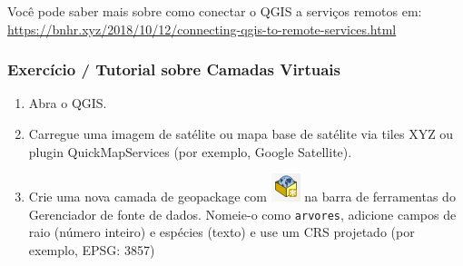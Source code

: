 \documentclass[
]{book}
\providecommand{\tightlist}{%
  \setlength{\itemsep}{0pt}\setlength{\parskip}{0pt}}
\begin{document}
Você pode saber mais sobre como conectar o QGIS a serviços remotos em: \href{https://bnhr.xyz/2018/\%2012/10\%20/\%20Connecting-qgis-to-remote-services.html}{https://bnhr.xyz/2018/10/12/connecting-qgis-to-remote-services.html}

\hypertarget{exercuxedcio-tutorial-sobre-camadas-virtuais}{%
\subsubsection{\texorpdfstring{\textbf{Exercício / Tutorial sobre Camadas Virtuais}}{Exercício / Tutorial sobre Camadas Virtuais}}\label{exercuxedcio-tutorial-sobre-camadas-virtuais}}

\begin{enumerate}
\def\labelenumi{\arabic{enumi}.}
\tightlist
\item
  Abra o QGIS.
\item
  Carregue uma imagem de satélite ou mapa base de satélite via tiles XYZ ou plugin QuickMapServices (por exemplo, Google Satellite).
\item
  Crie uma nova camada de geopackage com \includegraphics{media/modulo2/symbol-gpkg.png} na barra de ferramentas do Gerenciador de fonte de dados. Nomeie-o como \texttt{arvores}, adicione campos de raio (número inteiro) e espécies (texto) e use um CRS projetado (por exemplo, EPSG: 3857)
\end{enumerate}
\end{document}
